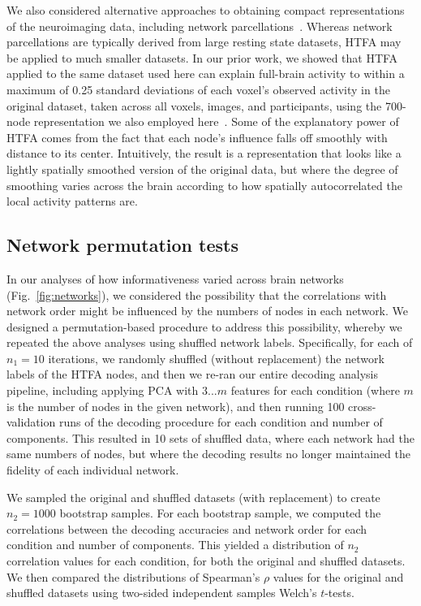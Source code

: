 \documentclass[english, 11pt]{article}
\begin{document}
We also considered alternative approaches to obtaining compact representations
of the neuroimaging data, including network
parcellations~\citep[e.g.,][]{SchaEtal18, GordEtal16}. Whereas network
parcellations are typically derived from large resting state datasets, HTFA may
be applied to much smaller datasets. In our prior work, we showed that HTFA
applied to the same dataset used here can explain full-brain activity to within
a maximum of 0.25 standard deviations of each voxel's observed activity in the
original dataset, taken across all voxels, images, and participants, using the
700-node representation we also employed here~\citep{MannEtal18}. Some of the
explanatory power of HTFA comes from the fact that each node's influence falls
off smoothly with distance to its center. Intuitively, the result is a
representation that looks like a lightly spatially smoothed version of the
original data, but where the degree of smoothing varies across the brain
according to how spatially autocorrelated the local activity patterns are.

\subsection*{Network permutation tests}

In our analyses of how informativeness varied across brain networks
(Fig.~\ref{fig:networks}), we considered the possibility that the correlations
with network order might be influenced by the numbers of nodes in each network.
We designed a permutation-based procedure to address this possibility, whereby
we repeated the above analyses using shuffled network labels. Specifically, for
each of $n_1 = 10$ iterations, we randomly shuffled (without replacement) the
network labels of the HTFA nodes, and then we re-ran our entire decoding
analysis pipeline, including applying PCA with $3...m$ features for each
condition (where $m$ is the number of nodes in the given network), and then
running 100 cross-validation runs of the decoding procedure for each condition
and number of components. This resulted in 10 sets of shuffled data, where each
network had the same numbers of nodes, but where the decoding results no longer
maintained the fidelity of each individual network.

We sampled the original and shuffled datasets (with replacement) to create $n_2
= 1000$ bootstrap samples. For each bootstrap sample, we computed the
correlations between the decoding accuracies and network order for each
condition and number of components. This yielded a distribution of $n_2$
correlation values for each condition, for both the original and shuffled
datasets. We then compared the distributions of Spearman's $\rho$ values for
the original and shuffled datasets using two-sided independent samples Welch's
$t$-tests.
\end{document}
